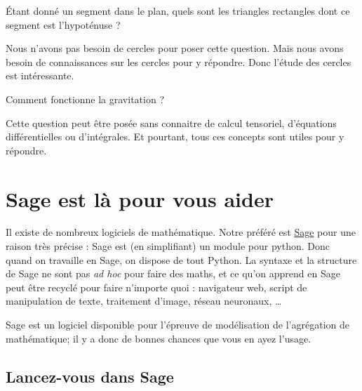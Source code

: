 \begin{example}
	Étant donné un segment dans le plan, quels sont les triangles rectangles dont ce segment est l'hypoténuse ?

	Nous n'avons pas besoin de cercles pour poser cette question. Mais nous avons besoin de connaissances sur les cercles pour y répondre. Donc l'étude des cercles est intéressante.
\end{example}

\begin{example}
	Comment fonctionne la gravitation ?

	Cette question peut être posée sans connaitre de calcul tensoriel, d'équations différentielles ou d'intégrales. Et pourtant, tous ces concepts sont utiles pour y répondre.
\end{example}

\section{Sage est là pour vous aider}

Il existe de nombreux logiciels de mathématique. Notre préféré est \href{http://www.sagemath.org}{Sage} pour une raison très précise : Sage est (en simplifiant) un module pour python. Donc quand on travaille en Sage, on dispose de tout Python. La syntaxe et la structure de Sage ne sont pas \emph{ad hoc} pour faire des maths, et ce qu'on apprend en Sage peut être recyclé pour faire n'importe quoi : navigateur web, script de manipulation de texte, traitement d'image, réseau neuronaux, \ldots


Sage est un logiciel disponible pour l'épreuve de modélisation de l'agrégation de mathématique; il y a donc de bonnes chances que vous en ayez l'usage.

\subsection{Lancez-vous dans Sage}


